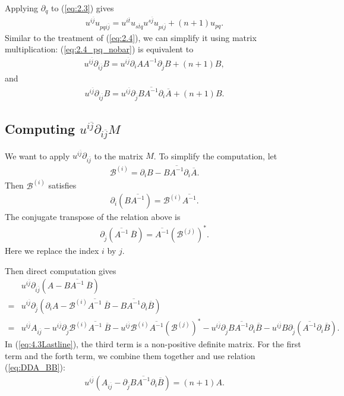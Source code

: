 \documentclass{article}
\numberwithin{equation}{section}
\newcommand{\ijbar}{{i\overline j}}
\newcommand{\jbar}{{\overline{j}}}
\newcommand{\Abar}{{\overline{A}}}
\newcommand{\Bbar}{{\overline{B}}}
\newcommand{\Abarinverse}{\overline{A^{-1}}}
\newcommand{\Ainverse}{{A^{-1}}}
\newcommand{\BBi}{{\mathscr{B}^{(i)}}}
\newcommand{\BBj}{{\mathscr{B}^{(j)}}}
\newcommand{\BBjbar}{{\left(\BBj\right)^\ast}}
\newcommand{\partiali}{\partial_i}
\newcommand{\partialjbar}{\partial_{\overline j}}
\newcommand{\uijbar}{{u^{\ijbar}}}
\begin{document}
Applying $\partial_q$ to (\ref{eq:2.3}) gives
 \begin{align}
	u^{\ijbar}{u_{pq\ijbar}}=u^{i\overline t}u_{s\overline t q} u^{s\jbar} u_{p\ijbar}+(n+1) u_{pq}.
	\label{eq:2.4_pq_nobar}
\end{align}
Similar to the treatment of (\ref{eq:2.4}), we can simplify it using matrix multiplication: (\ref{eq:2.4_pq_nobar}) is equivalent to 
\begin{align}
	 	u^{\ijbar} \partial_{\ijbar}B=u^{\ijbar}\partiali A \Ainverse \partialjbar B+(n+1)B,
	\label{eq:DDB_AB}
\end{align} and
\begin{align}
	    u^{\ijbar} \partial_{\ijbar}B=u^{\ijbar}\partialjbar B \Abarinverse \partiali \Abar+(n+1)B.
	\label{eq:DDB_BA}
\end{align}
\subsection{Computing $u^{\ijbar}{\partial_{\ijbar}} M$}
\label{sec:computing_LM}
We want to apply $u^{\ijbar}\partial_{\ijbar}$ to the matrix $M$. To simplify the computation, let
\begin{align}
	\BBi=\partial_iB -B\Abarinverse \partial_i\Abar.
\end{align}
Then $\BBi$ satisfies
\begin{align}
	\partial_i(B\Abarinverse)=\BBi\Abarinverse.
\end{align}
The  conjugate transpose of the relation above is 
\begin{align}
	\partial_\jbar(\Abarinverse\ \Bbar)=\Abarinverse\left(\BBj\right)^\ast.
\end{align} Here we replace the index $i$ by $j$.

Then direct computation gives
\begin{align}
	&u^{\ijbar}\partial_{\ijbar}(A-B\Abarinverse\ \Bbar)\\
	=&u^{\ijbar}\partialjbar\left(\partiali A-\BBi\Abarinverse\ \Bbar-B\Abarinverse\partiali\Bbar\right)\\
	=&\uijbar A_{\ijbar}-\uijbar\partialjbar\BBi\Abarinverse\ \overline{B}-\uijbar\BBi\Abarinverse\BBjbar
	   -\uijbar \partial_\jbar B\Abarinverse\partial_i\Bbar-\uijbar B\partial_\jbar\left(\Abarinverse \partial_i\Bbar\right).
	\label{eq:4.3Lastline}
\end{align}
In (\ref{eq:4.3Lastline}), the third term  is a non-positive definite matrix. 
For the first term and the forth term, we combine them together and use relation (\ref{eq:DDA_BB}):
\begin{align}
	u^{\ijbar}\left(A_{\ijbar}-\partialjbar B\Abarinverse \partiali\Bbar\right)=(n+1)A.
	\label{eq:partial_Res_1}
\end{align}
\end{document}
